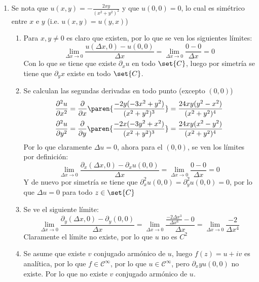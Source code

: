 \documentclass{homework}
\begin{document}
\begin{sol}
\begin{enumerate}[label=(\alph*)]
\begin{enumerate}[label=(\roman*)]
        \end{enumerate}
        \item Se nota que \(u(x,y)=-\frac{2xy}{(x^2+y^2)^2}\) y que \(u(0,0)=0\), lo cual es simétrico entre \(x\) e \(y\) (i.e. \(u(x,y)=u(y,x)\))
        \begin{enumerate}[label=(\roman*)]
            \item Para \(x,y\neq0\) es claro que existen, por lo que se ven los siguientes límites:
            \begin{equation*}
                \lim_{\Delta x\rightarrow 0}\frac{u(\Delta x,0)-u(0,0)}{\Delta x}=\lim_{\Delta x\rightarrow 0}\frac{0-0}{\Delta x}=0
            \end{equation*}
            Con lo que se tiene que existe \(\partial_x u\) en todo \(\set{C}\), luego por simetría se tiene que \(\partial_y x\) existe en todo \(\set{C}\).
            \item  Se calculan las segundas derivadas en todo punto (excepto \((0,0)\))
            \begin{align*}
                \frac{\partial^2 u}{\partial x^2}=\frac{\partial}{\partial x}\paren{\frac{-2 y (-3 x^2 + y^2)}{(x^2 + y^2)^3}}=\frac{24 x y (y^2 - x^2)}{(x^2 + y^2)^4}\\
                \frac{\partial^2 u}{\partial y^2}=\frac{\partial}{\partial y}\paren{\frac{-2 x (-3 y^2 + x^2)}{(x^2 + y^2)^3}}=\frac{24 x y (x^2 - y^2)}{(x^2 + y^2)^4}
            \end{align*}
            Por lo que claramente \(\Delta u=0\), ahora para el \((0,0)\), se ven los límites por definición:
            \begin{equation*}
                \lim_{\Delta x\rightarrow 0}\frac{\partial_x(\Delta x, 0)-\partial_x u(0, 0)}{\Delta x}=\lim_{\Delta x\rightarrow 0}\frac{0-0}{\Delta x}=0
            \end{equation*}
            Y de nuevo por simetría se tiene que \(\partial^2_x u(0,0)=\partial^2_y u(0,0)=0\), por lo que \(\Delta u=0\) para todo \(z\in\set{C}\)
            \item Se ve el siguiente límite:
            \begin{equation*}
                \lim_{\Delta x\rightarrow 0}\frac{\partial_y(\Delta x, 0)-\partial_y(0,0)}{\Delta x}=\lim_{\Delta x\rightarrow 0}\frac{\frac{-2\Delta x^3}{\Delta x^6}-0}{\Delta x}=\lim_{\Delta x\rightarrow 0}\frac{-2}{\Delta x^4}
            \end{equation*}
            Claramente el límite no existe, por lo que \(u\) no es \(C^2\)
            \item Se asume que existe \(v\) conjugado armónico de \(u\), luego \(f(z)=u+iv\) es analítica, por lo que \(f\in\mathcal{C}^\infty\), por lo que \(u\in\mathcal{C}^\infty\), pero \(\partial_xy u(0,0)\) no existe. Por lo que no existe \(v\) conjugado armónico de \(u\).
        \end{enumerate}
    \end{enumerate}
\end{sol}
\end{document}
